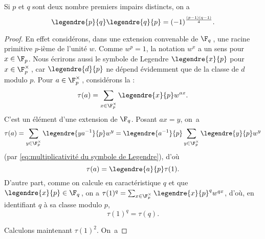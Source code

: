\documentclass[11pt, useosf,
  title in boldface,
  theorem in new line,
  theorem numbering = section,
  number theorems separately,
]{simplivre}
\begin{document}
    \begin{theorem}\label{thm:loi de réciprocité quadratique}
        Si \( p \) et \( q \) sont deux nombre premiers impairs distincts, on a
        \[
            \legendre{p}{q} \legendre{q}{p} = (-1)^{\frac{(p-1)(q-1)}{4}}.
        \]
    \end{theorem}
    \vspace{-.5\baselineskip}
    \begin{proof}
        En effet considérons, dans une extension convenable de \( \F_q \)\,, une racine primitive \( p \)‑ième de l'unité \( w \). Comme \( w^p = 1 \), la notation \( w^x \) a un sens pour \( x \in \F_p \). Nous écrirons aussi le symbole de Legendre \( \legendre{x}{p} \) pour \( x \in \F_p^\times \)\,, car \( \legendre{d}{p} \) ne dépend évidemment que de la classe de \( d \) modulo \( p \). Pour \( a \in \F_p^\times \)\,, considérons la  :
        \begin{equation}
            \tau(a) = \sum_{x \in \F_p^\times} \legendre{x}{p} w^{ax}.
        \end{equation}
        C'est un élément d'une extension de \( \F_q \). Posant \( ax = y \), on~a
        \[
            \tau(a) = \sum_{y \in \F_p^\times} \legendre{ya^{-1}}{p} w^y = \legendre{a^{-1}}{p} \sum_{y \in \F_p^\times} \legendre{y}{p} w^y
        \]
        (par \eqref{eq:multiplicativité du symbole de Legendre}), d'où
        \vspace{-.2\baselineskip}%
        \begin{equation}\label{eq:somme de Gauss;relation entre a et 1}
            \tau(a) = \legendre{a}{p} \tau(1).
        \end{equation}
        D'autre part, comme on calcule en caractéristique \( q \) et que \( \legendre{x}{p} \in \F_q \)\,, on a \( \tau(1)^q = \sum_{x \in \F_p^\times} \legendre{x}{p}^q w^{qx} \), d'où, en identifiant \( q \) à sa classe modulo \( p \),
        \vspace{-.2\baselineskip}%
        \begin{equation}\label{eq:somme de Gauss;relation entre q et 1}
            \tau(1)^q = \tau(q).
        \end{equation}
        \vspace{-1.2\baselineskip}\par\noindent%
        Calculons maintenant \( \tau(1)^2 \). On~a

\end{proof}
\end{document}
